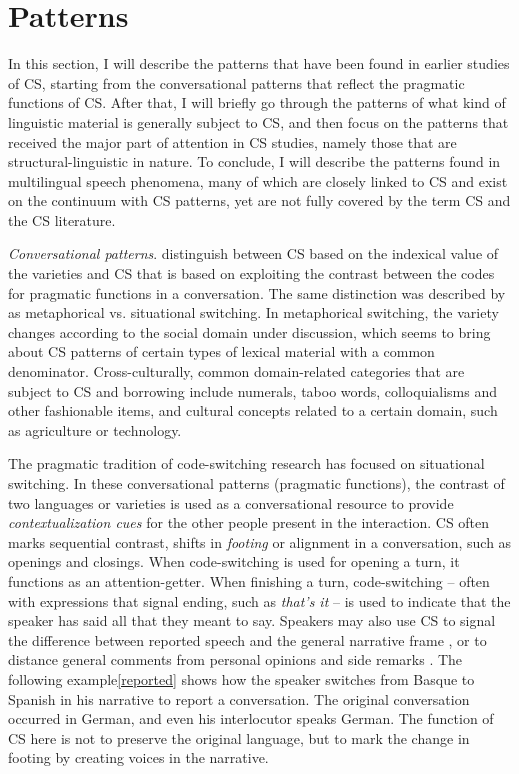 \documentclass[output=paper,
modfonts
]{langscibook}
\begin{document}
\section{Patterns} \label{patterns}

In this section, I will describe the patterns that have been found in earlier studies of CS, starting from the conversational patterns that reflect the pragmatic functions of CS. After that, I will briefly go through the patterns of what kind of linguistic material is generally subject to CS, and then focus on the patterns that received the major part of attention in CS studies, namely those that are structural-linguistic in nature. To conclude, I will describe the patterns found in multilingual speech phenomena, many of which are closely linked to CS and exist on the continuum with CS patterns, yet are not fully covered by the term CS and the CS literature. 

\textit{Conversational patterns}. \cite[]{milroy2003sociolinguistics} distinguish between CS based on the indexical value of the varieties and CS that is based on exploiting the contrast between the codes for pragmatic functions in a conversation. The same distinction was described by \cite{blom1972directions} as metaphorical vs. situational switching. In metaphorical switching, the variety changes according to the social domain under discussion, which seems to bring about CS patterns of certain types of lexical material with a common denominator. Cross-culturally, common domain-related categories that are subject to CS and borrowing include numerals, taboo words, colloquialisms and other fashionable items, and cultural concepts related to a certain domain, such as agriculture or technology.

The pragmatic tradition of code-switching research has focused on situational switching. In these conversational patterns (pragmatic functions), the contrast of two languages or varieties is used as a conversational resource to provide \textit{contextualization cues} \parencite{gumperz1982discourse} for the other people present in the interaction. CS often marks sequential contrast, shifts in \textit{footing} \parencite{goffman1981forms} or alignment in a conversation, such as openings and closings.  When code-switching is used for opening a turn, it functions as an attention-getter. When finishing a turn, code-switching – often with expressions that signal ending, such as \textit{that’s it} – is used to indicate that the speaker has said all that they meant to say. Speakers may also use CS to signal the difference between reported speech and the general narrative frame \parencite{alfonzetti1998conversational}, or to distance general comments from personal opinions and side remarks \parencite{gumperz1982discourse}. The following example\ref{reported} shows how the speaker switches from Basque to Spanish in his narrative to report a conversation. The original conversation occurred in German, and even his interlocutor speaks German. The function of CS here is not to preserve the original language, but to mark the change in footing by creating voices in the narrative.
\end{document}
